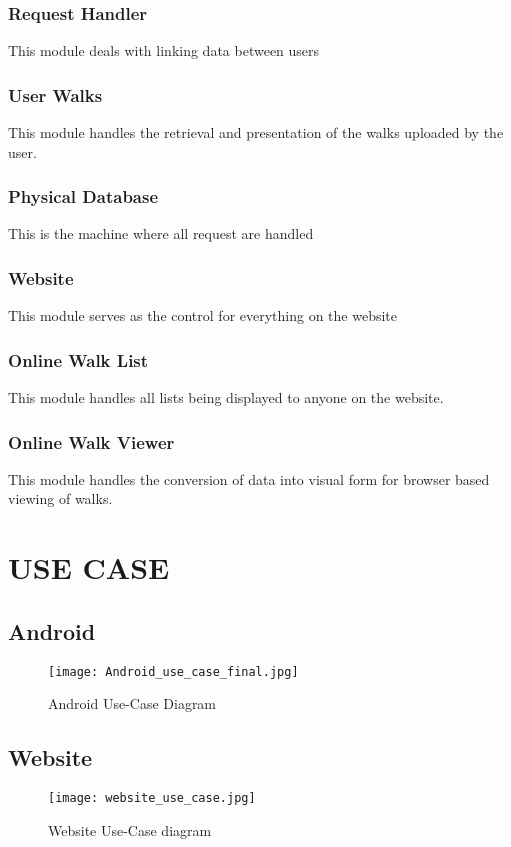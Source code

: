 \documentclass[12pt]{article}
\begin{document}
\subsubsection{Request Handler}
\par{This module deals with linking data between users}
\subsubsection{User Walks}
This module handles the retrieval and presentation of the walks uploaded by the user.
\subsubsection{Physical Database}
\par{This is the machine where all request are handled}
\subsubsection{Website}
\par{This module serves as the control for everything on the website}
\subsubsection{Online Walk List}
This module handles all lists being displayed to anyone on the website.
\subsubsection{Online Walk Viewer}
This module handles the conversion of data into visual form for browser based viewing of walks.
\newpage
\section{USE CASE}
\subsection{Android}
\begin{figure}[htp]
\centering
\texttt{[image: Android\_use\_case\_final.jpg]}
\caption{Android Use-Case Diagram}
\label{Android Use-Case Diagram}
\end{figure}
\subsection{Website}
\clearpage
\begin{figure}[htp]
\centering
\texttt{[image: website\_use\_case.jpg]}
\caption{Website Use-Case diagram}
\label{Website Use-Case diagram}
\end{figure}
\end{document}
